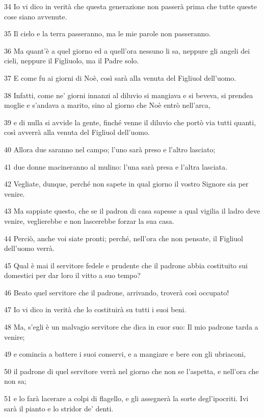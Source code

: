 \par 34 Io vi dico in verità che questa generazione non passerà prima che tutte queste cose siano avvenute.
\par 35 Il cielo e la terra passeranno, ma le mie parole non passeranno.
\par 36 Ma quant'è a quel giorno ed a quell'ora nessuno li sa, neppure gli angeli dei cieli, neppure il Figliuolo, ma il Padre solo.
\par 37 E come fu ai giorni di Noè, così sarà alla venuta del Figliuol dell'uomo.
\par 38 Infatti, come ne' giorni innanzi al diluvio si mangiava e si beveva, si prendea moglie e s'andava a marito, sino al giorno che Noè entrò nell'arca,
\par 39 e di nulla si avvide la gente, finché venne il diluvio che portò via tutti quanti, così avverrà alla venuta del Figliuol dell'uomo.
\par 40 Allora due saranno nel campo; l'uno sarà preso e l'altro lasciato;
\par 41 due donne macineranno al mulino: l'una sarà presa e l'altra lasciata.
\par 42 Vegliate, dunque, perché non sapete in qual giorno il vostro Signore sia per venire.
\par 43 Ma sappiate questo, che se il padron di casa sapesse a qual vigilia il ladro deve venire, veglierebbe e non lascerebbe forzar la sua casa.
\par 44 Perciò, anche voi siate pronti; perché, nell'ora che non pensate, il Figliuol dell'uomo verrà.
\par 45 Qual è mai il servitore fedele e prudente che il padrone abbia costituito sui domestici per dar loro il vitto a suo tempo?
\par 46 Beato quel servitore che il padrone, arrivando, troverà così occupato!
\par 47 Io vi dico in verità che lo costituirà su tutti i suoi beni.
\par 48 Ma, s'egli è un malvagio servitore che dica in cuor suo: Il mio padrone tarda a venire;
\par 49 e comincia a battere i suoi conservi, e a mangiare e bere con gli ubriaconi,
\par 50 il padrone di quel servitore verrà nel giorno che non se l'aspetta, e nell'ora che non sa;
\par 51 e lo farà lacerare a colpi di flagello, e gli assegnerà la sorte degl'ipocriti. Ivi sarà il pianto e lo stridor de' denti.

